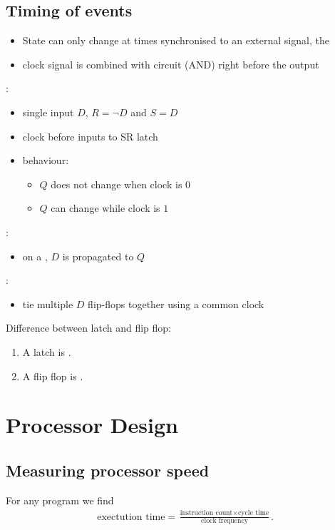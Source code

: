 \documentclass{article}
\begin{document}
\subsection{Timing of events}
\begin{itemize}
	\item State can only change at times synchronised to an external signal, the 
	\item clock signal is combined with circuit (AND) right before the output
\end{itemize}
:
\begin{itemize}
	\item single input $D$, $R=\neg D$ and $S=D$
	\item clock before inputs to SR latch
	\item behaviour: \begin{itemize}
		\item $Q$ does not change when clock is $0$
		\item $Q$ can change while clock is $1$
	\end{itemize}
\end{itemize}
:
\begin{itemize}
	\item on a , $D$ is propagated to $Q$
\end{itemize}
:
\begin{itemize}
	\item tie multiple $D$ flip-flops together using a common clock
\end{itemize}
\begin{definition}
Difference between latch and flip flop:
\begin{enumerate}
	\item A latch is .
	\item A flip flop is .
\end{enumerate}
\end{definition}
\section{Processor Design}
\subsection{Measuring processor speed}
\begin{theorem}
	\label{exectime}
	For any program we find 
	\begin{align*}
		\text{exectution time} 
		= \frac{\text{instruction count} \times \text{cycle time}}{\text{clock frequency}}.
	\end{align*}
\end{theorem}
\end{document}
